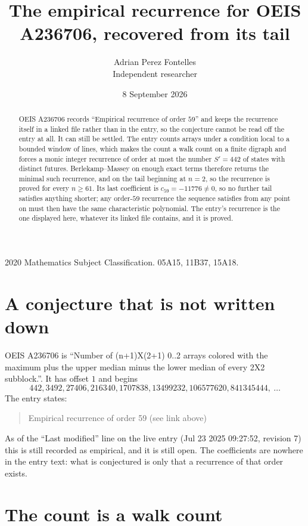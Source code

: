 \documentclass[11pt,a4paper]{article}
\title{The empirical recurrence for OEIS A236706, recovered from its tail}
\author{Adrian Perez Fontelles\\ \small Independent researcher}
\date{8 September 2026}
\theoremstyle{plain}
\theoremstyle{definition}
\begin{document}
\maketitle

\begin{abstract}
OEIS A236706 records ``Empirical recurrence of order $59$'' and keeps the recurrence itself in
a linked file rather than in the entry, so the conjecture cannot be read off the entry at all.
It can still be settled. The entry counts arrays under a condition local to a bounded window of
lines, which makes the count a walk count on a finite digraph and forces a monic integer
recurrence of order at most the number $S'=442$ of states with distinct futures. Berlekamp--Massey on
enough exact terms therefore returns the minimal such recurrence, and on the tail beginning at $n=2$, so the recurrence is proved for every $n\ge61$.
Its last coefficient is $c_{59}=-11776\neq0$, so no further tail satisfies anything
shorter; any order-$59$ recurrence the sequence satisfies from any point on must then have
the same characteristic polynomial. The entry's recurrence is the one displayed here, whatever
its linked file contains, and it is proved.
\end{abstract}

\noindent\small 2020 Mathematics Subject Classification. 05A15, 11B37, 15A18.\normalsize

\section{A conjecture that is not written down}

OEIS A236706 is ``Number of (n+1)X(2+1) 0..2 arrays colored with the maximum plus the upper median minus the lower median of every 2X2 subblock.''. It has offset $1$ and begins
\[
442, 3492, 27406, 216340, 1707838, 13499232, 106577620, 841345444,\ \dots
\]
The entry states:
\begin{quote}
Empirical recurrence of order 59 (see link above)
\end{quote}
As of the ``Last modified'' line on the live entry (Jul 23 2025 09:27:52, revision 7)
this is still recorded as empirical, and it is still open. The coefficients are nowhere in the
entry text: what is conjectured is only that a recurrence of that order exists.

\section{The count is a walk count}
\end{document}
